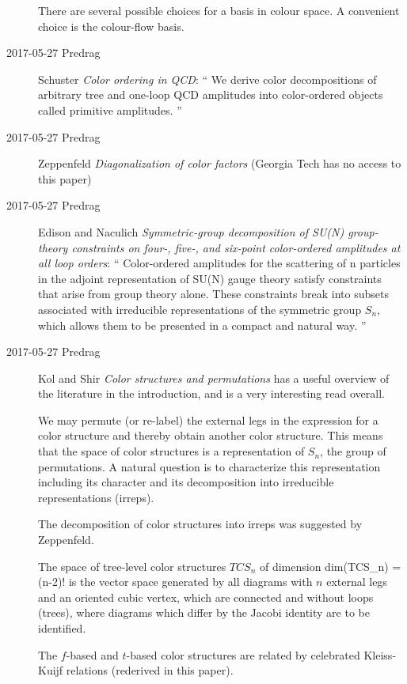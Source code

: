 \begin{description}
There are several possible choices for a basis in colour space.
A convenient choice is the colour-flow basis.

\item[2017-05-27 Predrag]
Schuster {\em Color ordering in {QCD}}: ``
We derive color decompositions of arbitrary tree and one-loop QCD
amplitudes into color-ordered objects called primitive amplitudes.
''

\item[2017-05-27 Predrag]
Zeppenfeld
{\em Diagonalization of color factors} (Georgia Tech has no access to this paper)

\item[2017-05-27 Predrag]
Edison and Naculich {\em Symmetric-group decomposition
of {SU(N)} group-theory constraints on four-, five-, and six-point
color-ordered amplitudes at all loop orders}: ``
Color-ordered amplitudes for the scattering of n particles in the adjoint
representation of SU(N) gauge theory satisfy constraints that arise from
group theory alone. These constraints break into subsets associated with
irreducible representations of the symmetric group $S_n$, which allows
them to be presented in a compact and natural way.
''

\item[2017-05-27 Predrag]
Kol and Shir
{\em Color structures and permutations} has a
useful overview of the literature in the introduction, and is a very
interesting read overall.

We may permute (or re-label) the external legs in the expression for a
color structure and thereby obtain another color structure. This means
that the space of color structures is a representation of $S_n$, the
group of permutations. A natural question is to characterize this
representation including its character and its decomposition into
irreducible representations (irreps).

The decomposition of color structures into irreps was suggested by
Zeppenfeld.

The space of tree-level color structures $TCS_n$ of dimension
\beq
\mbox{dim}(TCS_n) = (n-2)!
is the vector space
generated by all diagrams with $n$ external legs and an oriented cubic
vertex, which are connected and without loops (trees), where diagrams
which differ by the Jacobi identity are to be identified.

The $f$-based and $t$-based color structures are related by celebrated
Kleiss-Kuijf relations (rederived in this paper).


\end{description}
